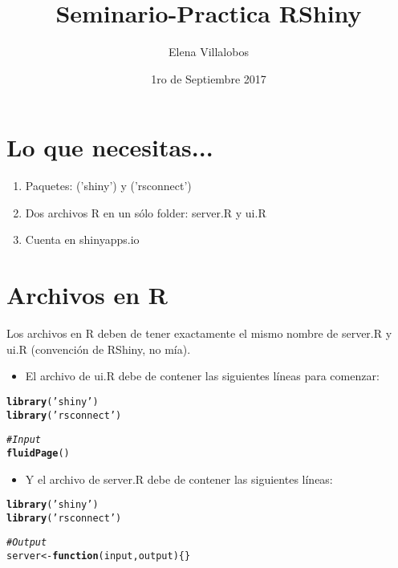 \documentclass[11pt, oneside]{article}\usepackage[]{graphicx}\usepackage[]{color}
\title{Seminario-Practica RShiny}
\author{Elena Villalobos}
\date{1ro de Septiembre 2017}							%
\makeatletter
\newcommand{\hlstr}[1]{\textcolor[rgb]{0.192,0.494,0.8}{#1}}%
\newcommand{\hlcom}[1]{\textcolor[rgb]{0.678,0.584,0.686}{\textit{#1}}}%
\newcommand{\hlstd}[1]{\textcolor[rgb]{0.345,0.345,0.345}{#1}}%
\newcommand{\hlkwa}[1]{\textcolor[rgb]{0.161,0.373,0.58}{\textbf{#1}}}%
\newcommand{\hlkwb}[1]{\textcolor[rgb]{0.69,0.353,0.396}{#1}}%
\newcommand{\hlkwc}[1]{\textcolor[rgb]{0.333,0.667,0.333}{#1}}%
\newcommand{\hlkwd}[1]{\textcolor[rgb]{0.737,0.353,0.396}{\textbf{#1}}}%
\newenvironment{kframe}{%
 \def\at@end@of@kframe{}%
 \ifinner\ifhmode%
  \def\at@end@of@kframe{\end{minipage}}%
  \begin{minipage}{\columnwidth}%
 \fi\fi%
 \def\FrameCommand##1{\hskip\@totalleftmargin \hskip-\fboxsep
 \colorbox{shadecolor}{##1}\hskip-\fboxsep
     \hskip-\linewidth \hskip-\@totalleftmargin \hskip\columnwidth}%
 \MakeFramed {\advance\hsize-\width
   \@totalleftmargin\z@ \linewidth\hsize
   \@setminipage}}%
 {\par\unskip\endMakeFramed%
 \at@end@of@kframe}
\newenvironment{knitrout}{}{} %
\makeatother
\begin{document}
\maketitle

\section{Lo que necesitas...}

\begin{enumerate}
 \item Paquetes: ('shiny') y ('rsconnect')
 \item Dos archivos R en un sólo folder: server.R y ui.R
 \item Cuenta en shinyapps.io
\end{enumerate}

\section{Archivos en R}

Los archivos en R deben de tener exactamente el mismo nombre de server.R y ui.R (convención de RShiny, no mía). 

\begin{itemize}
 \item El archivo de ui.R debe de contener las siguientes líneas para comenzar:
\end{itemize}

\begin{knitrout}
\color{fgcolor}\begin{kframe}
\begin{alltt}
\hlkwd{library}\hlstd{(}\hlstr{'shiny'}\hlstd{)}
\hlkwd{library}\hlstd{(}\hlstr{'rsconnect'}\hlstd{)}

\hlcom{# Input}
\hlkwd{fluidPage}\hlstd{()}
\end{alltt}
\end{kframe}
\end{knitrout}

\begin{itemize}
 \item Y el archivo de server.R debe de contener las siguientes líneas:
\end{itemize}

\begin{knitrout}
\color{fgcolor}\begin{kframe}
\begin{alltt}
\hlkwd{library}\hlstd{(}\hlstr{'shiny'}\hlstd{)}
\hlkwd{library}\hlstd{(}\hlstr{'rsconnect'}\hlstd{)}


\hlcom{# Output}
\hlstd{server} \hlkwb{<-} \hlkwa{function}\hlstd{(}\hlkwc{input}\hlstd{,}\hlkwc{output}\hlstd{)\{\}}
\end{alltt}
\end{kframe}
\end{knitrout}
\end{document}
